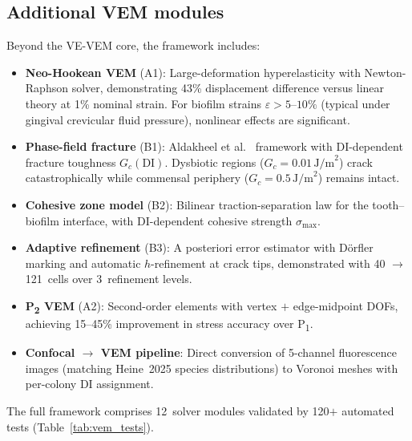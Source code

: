\subsection{Additional VEM modules}
\label{sec:vem:additional}

Beyond the VE-VEM core, the framework includes:
\begin{itemize}
  \item \textbf{Neo-Hookean VEM} (A1): Large-deformation hyperelasticity
    with Newton-Raphson solver, demonstrating 43\% displacement difference
    versus linear theory at 1\% nominal strain.  For biofilm strains
    $\varepsilon > 5$--$10\%$ (typical under gingival crevicular fluid
    pressure), nonlinear effects are significant.
  \item \textbf{Phase-field fracture} (B1): Aldakheel et al.~\cite{Aldakheel2018}
    framework with DI-dependent fracture toughness
    $G_c(\mathrm{DI})$.  Dysbiotic regions ($G_c = 0.01\,\text{J/m}^2$)
    crack catastrophically while commensal periphery
    ($G_c = 0.5\,\text{J/m}^2$) remains intact.
  \item \textbf{Cohesive zone model} (B2): Bilinear traction-separation law
    for the tooth--biofilm interface, with DI-dependent cohesive strength
    $\sigma_{\max}$.
  \item \textbf{Adaptive refinement} (B3): A posteriori error estimator
    with Dörfler marking and automatic $h$-refinement at crack tips,
    demonstrated with 40 $\to$ 121~cells over 3~refinement levels.
  \item \textbf{P\textsubscript{2} VEM} (A2): Second-order elements with
    vertex $+$ edge-midpoint DOFs, achieving 15--45\% improvement in stress
    accuracy over P\textsubscript{1}.
  \item \textbf{Confocal $\to$ VEM pipeline}: Direct conversion of 5-channel
    fluorescence images (matching Heine~2025 species distributions) to
    Voronoi meshes with per-colony DI assignment.
\end{itemize}

The full framework comprises 12~solver modules validated by
120$+$ automated tests (Table~\ref{tab:vem_tests}).

